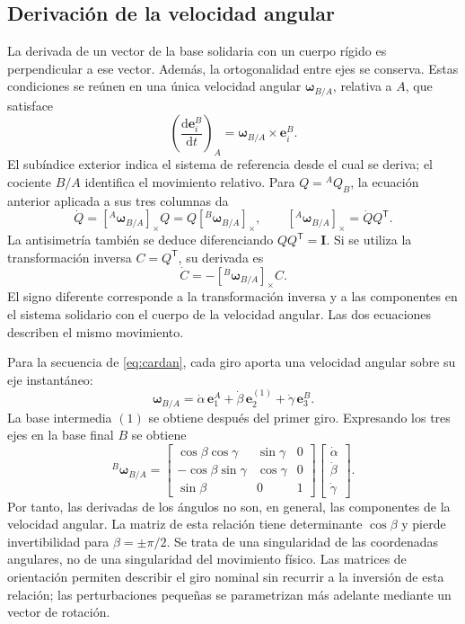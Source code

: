 \documentclass[11pt,a4paper,oneside]{report}
\newcommand{\vct}[1]{\bm{#1}}
\newcommand{\dd}{\mathrm d}
\newcommand{\Id}{\mathbf I}
\newcommand{\tr}{\mathsf T}
\begin{document}
\subsection{Derivación de la velocidad angular}
La derivada de un vector de la base solidaria con un cuerpo rígido es perpendicular a ese vector. Además, la ortogonalidad entre ejes se conserva. Estas condiciones se reúnen en una única velocidad angular $\vct\omega_{B/A}$, relativa a $A$, que satisface
\begin{equation}
 \left(\frac{\dd\vct e_i^B}{\dd t}\right)_A
 =\vct\omega_{B/A}\times\vct e_i^B.
 \label{eq:derivada-ejes}
\end{equation}
El subíndice exterior indica el sistema de referencia desde el cual se deriva; el cociente $B/A$ identifica el movimiento relativo. Para $Q={}^AQ_B$, la ecuación anterior aplicada a sus tres columnas da
\begin{equation}
 \dot Q=[{}^A\vct\omega_{B/A}]_\times Q
       =Q[{}^B\vct\omega_{B/A}]_\times,\qquad
 [ {}^A\vct\omega_{B/A}]_\times=\dot Q Q^\tr.
 \label{eq:Qdot}
\end{equation}
La antisimetría también se deduce diferenciando $QQ^\tr=\Id$. Si se utiliza la transformación inversa $C=Q^\tr$, su derivada es
\begin{equation}
 \dot C=-[{}^B\vct\omega_{B/A}]_\times C.
 \label{eq:Cdot}
\end{equation}
El signo diferente corresponde a la transformación inversa y a las componentes en el sistema solidario con el cuerpo de la velocidad angular. Las dos ecuaciones describen el mismo movimiento.

Para la secuencia de \eqref{eq:cardan}, cada giro aporta una velocidad angular sobre su eje instantáneo:
\begin{equation}
 \vct\omega_{B/A}
 =\dot\alpha\,\vct e_1^A
  +\dot\beta\,\vct e_2^{(1)}
  +\dot\gamma\,\vct e_3^B.
\end{equation}
La base intermedia $(1)$ se obtiene después del primer giro. Expresando los tres ejes en la base final $B$ se obtiene
\begin{equation}
 {}^B\vct\omega_{B/A}=
 \begin{bmatrix}
 \cos\beta\cos\gamma&\sin\gamma&0\\
 -\cos\beta\sin\gamma&\cos\gamma&0\\
 \sin\beta&0&1
 \end{bmatrix}
 \begin{bmatrix}\dot\alpha\\\dot\beta\\\dot\gamma\end{bmatrix}.
 \label{eq:cardan-velocidad}
\end{equation}
Por tanto, las derivadas de los ángulos no son, en general, las componentes de la velocidad angular. La matriz de esta relación tiene determinante $\cos\beta$ y pierde invertibilidad para $\beta=\pm\pi/2$. Se trata de una singularidad de las coordenadas angulares, no de una singularidad del movimiento físico. Las matrices de orientación permiten describir el giro nominal sin recurrir a la inversión de esta relación; las perturbaciones pequeñas se parametrizan más adelante mediante un vector de rotación.
\end{document}
